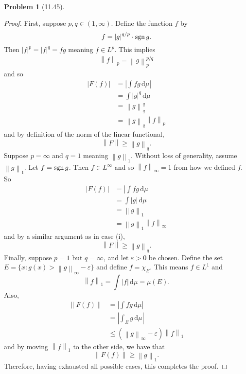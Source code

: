 \documentclass[12pt]{article}
\def\sgn{\mathop{\rm sgn}\nolimits}
\renewcommand{\epsilon}{\varepsilon}
\newcommand{\dif}{\, \mathrm{d}}
\newcommand{\norm}[1]{\left\lVert #1 \right\rVert}
\newcommand{\abs}[1]{\left\lvert #1 \right\rvert}
\theoremstyle{definition}
\newtheorem{problem}{Problem}
\begin{document}
\begin{problem}[11.45]
\begin{proof}
            First, suppose \( p, q \in (1, \infty)\). Define the function \( f \) by
                \[
                    f =  \abs{g}^{q/p} \cdot \sgn g.
                \]
            Then \( \abs{f}^p = \abs{f}^q = fg \) meaning \( f \in L^p \). This implies
                \begin{align*}
                    \norm{f}_p = \norm{g}^{p/q}_{p}
                \end{align*}
            and so
                \begin{align*}
                    \abs{F(f)} &= \abs{\int fg \dif \mu} \\ 
                    &= \int \abs{g}^q \dif \mu  \\
                    &= \norm{g}^q_q  \\
                    &= \norm{g}_q \norm{f}_p
                \end{align*}
            and by definition of the norm of the linear functional,
                \[
                    \norm{F} \geq \norm{g}_q.  
                \]
            Suppose \( p = \infty \) and \( q = 1 \) meaning \( \norm{g}_1 \). 
            Without loss of generality, assume \( \norm{g}_1 \). 
            Let \( f = \sgn g \). 
            Then \( f \in L^{\infty} \) and so \( \norm{f}_{\infty} = 1 \) from how we defined \( f \). 
            So
                \begin{align*}
                    \abs{F(f)} &= \abs{\int fg \dif \mu} \\
                    &= \int \abs{g} \dif \mu \\
                    &= \norm{g}_1 \\
                    &= \norm{g}_1 \norm{f}_{\infty}
                \end{align*}
            and by a similar argument as in case (i),
                \[
                    \norm{F} \geq \norm{g}_q.  
                \]
            Finally, suppose \( p  = 1 \) but \( q = \infty \), and let \( \epsilon > 0 \) be chosen. 
            Define the set \( E = \{ x: g(x) > \norm{g}_{\infty} - \epsilon \} \) and define \( f = \chi_{E} \). 
            This means \( f \in L^1 \) and
                \[
                    \norm{f}_1 = \int \abs{f} \dif \mu  = \mu(E).
                \]  
            Also,
                \begin{align*}
                    \norm{F(f)} &= \abs{\int fg \dif \mu } \\
                    &= \abs{\int_E g \dif \mu} \\
                    &\leq \left( \norm{g}_{\infty} - \epsilon \right) \norm{f}_1
                \end{align*}
            and by moving \( \norm{f}_1 \) to the other side, we have that
                \[
                    \norm{F(f)} \geq \norm{g}_1.  
                \]
            Therefore, having exhausted all possible cases, this completes the proof. 
        \end{proof}
\end{problem}
\end{document}
